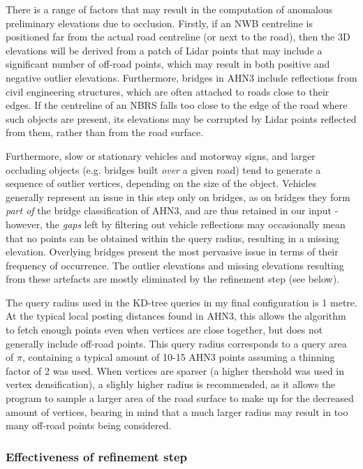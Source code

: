 There is a range of factors that may result in the computation of anomalous preliminary elevations due to occlusion. Firstly, if an NWB centreline is positioned far from the actual road centreline (or next to the road), then the 3D elevations will be derived from a patch of Lidar points that may include a significant number of off-road points, which may result in both positive and negative outlier elevations. Furthermore, bridges in AHN3 include reflections from civil engineering structures, which are often attached to roads close to their edges. If the centreline of an NBRS falls too close to the edge of the road where such objects are present, its elevations may be corrupted by Lidar points reflected from them, rather than from the road surface.

Furthermore, slow or stationary vehicles and motorway signs, and larger occluding objects (e.g. bridges built \textit{over} a given road) tend to generate a sequence of outlier vertices, depending on the size of the object. Vehicles generally represent an issue in this step only on bridges, as on bridges they form \textit{part of} the bridge classification of AHN3, and are thus retained in our input - however, the \textit{gaps} left by filtering out vehicle reflections may occasionally mean that no points can be obtained within the query radius, resulting in a missing elevation. Overlying bridges present the most pervasive issue in terms of their frequency of occurrence. The outlier elevations and missing elevations resulting from these artefacts are mostly eliminated by the refinement step (see below).

The query radius used in the KD-tree queries in my final configuration is 1 metre. At the typical local posting distances found in AHN3, this allows the algorithm to fetch enough points even when vertices are close together, but does not generally include off-road points. This query radius corresponds to a query area of $\pi$, containing a typical amount of 10-15 AHN3 points assuming a thinning factor of 2 was used. When vertices are sparser (a higher thershold was used in vertex densification), a slighly higher radius is recommended, as it allows the program to sample a larger area of the road surface to make up for the decreased amount of vertices, bearing in mind that a much larger radius may result in too many off-road points being considered.

\subsubsection{Effectiveness of refinement step}

